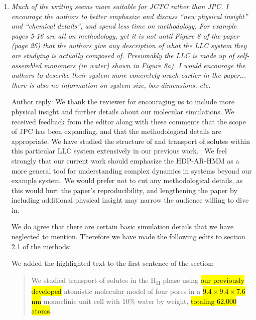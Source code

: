 \documentclass{article}
\begin{document}
\begin{enumerate}[label={Comment \theenumi :}, leftmargin=3.9\parindent]
    \item \textit{Much of the writing seems more suitable for JCTC rather than JPC. I encourage the
    authors to better emphasize and discuss “new physical insight” and “chemical details”, and spend
    less time on methodology. For example pages 5-16 are all on methodology, yet it is not until 
    Figure 8 of the paper (page 26) that the authors give any description of what the LLC system 
    they are studying is actually composed of. Presumably the LLC is made up of self-assembled 
    monomers (in water) shown in Figure 8a). I would encourage the authors to describe their 
    system more concretely much earlier in the paper... there is also no information on system 
    size, box dimensions, etc.}
    
    Author reply: We thank the reviewer for encouraging us to include more physical insight and
    further details about our molecular simulations. We received feedback from the editor along 
    with these comments that the scope of JPC has been expanding, and that the methodological 
    details are appropriate. We have studied the structure of and transport of solutes within 
    this particular LLC system extensively in our previous work.~\cite{coscia_chemically_2019}
    We feel strongly that our current work should emphasize the HDP-AR-HMM as a more general 
    tool for understanding complex dynamics in systems beyond our example system. We would prefer
    not to cut any methodological details, as this would hurt the paper's reproducibility, and
    lengthening the paper by including additional physical insight may narrow the audience willing
    to dive in.

    
    We do agree that there are certain basic simulation details that we have neglected to 
    mention. Therefore we have made the following edits to section 2.1 of the methods:
    
    We added the highlighted text to the first sentence of the section:
    \begin{quote}
      We studied transport of solutes in the H\textsubscript{II} phase using \hl{our
      previously developed} atomistic molecular model of four pores in a 
      \hl{$9.4\times9.4\times7.6$ nm} monoclinic unit cell with 10\% water by weight, 
      \hl{totaling 62,000 atoms}.    
    \end{quote}
    

\end{enumerate}
\end{document}

